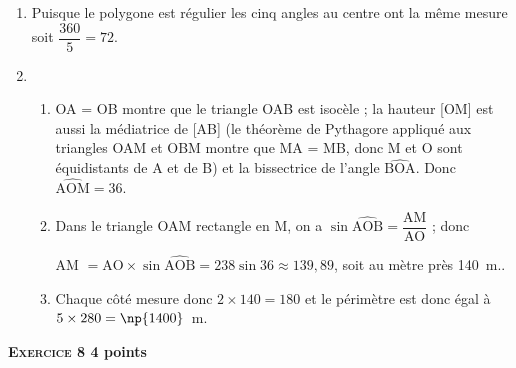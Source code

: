 \documentclass[10pt]{article}
\begin{document}
\medskip

\begin{enumerate}
\item %
Puisque le polygone est régulier les cinq angles au centre ont la même mesure soit $\dfrac{360}{5} = 72$\degres. 
\item %
	\begin{enumerate}
		\item %
OA = OB montre que le triangle OAB est isocèle  ; la hauteur [OM] est aussi la médiatrice de [AB] (le théorème de Pythagore appliqué aux triangles OAM et OBM montre que MA = MB, donc M et O sont équidistants de A et de B) et la bissectrice de l'angle $\widehat{\text{BOA}}$. 
Donc $\widehat{\text{AOM}} = 36$\degres.
		\item %
		Dans le triangle OAM rectangle en M, on a $\sin \widehat{\text{AOB}} = \dfrac{\text{AM}}{\text{AO}}$ ; donc 
		
AM $ =  {\text{AO}} \times \sin \widehat{\text{AOB}} = 238 \sin 36 \approx 139,89$, soit au mètre près 140~m..
		\item %
		Chaque côté mesure donc $2 \times 140 = 180$ et le périmètre est donc égal à $5 \times 280 = \np{1400}$~m.
	\end{enumerate}
\end{enumerate}
 
\bigskip

\textbf{\textsc{Exercice 8} \hfill 4 points}

\medskip  

%
%
\end{document}
